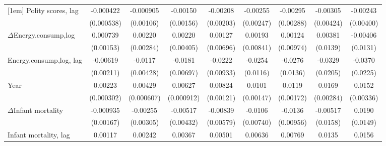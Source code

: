 \begin{table}[htbp]
\begin{tabular}{l*{8}{c}}
[1em]
Polity scores, lag           &   -0.000422         &   -0.000905         &    -0.00150         &    -0.00208         &    -0.00255         &    -0.00295         &    -0.00305         &    -0.00243         \\
                    &  (0.000538)         &   (0.00106)         &   (0.00156)         &   (0.00203)         &   (0.00247)         &   (0.00288)         &   (0.00424)         &   (0.00400)         \\
[1em]
$\Delta$Energy.consump,log             &    0.000739         &     0.00220         &     0.00220         &     0.00127         &     0.00193         &     0.00124         &     0.00381         &    -0.00406         \\
                    &   (0.00153)         &   (0.00284)         &   (0.00405)         &   (0.00696)         &   (0.00841)         &   (0.00974)         &    (0.0139)         &    (0.0131)         \\
[1em]
Energy.consump,log, lag            &    -0.00619\sym{***}&     -0.0117\sym{***}&     -0.0181\sym{**} &     -0.0222\sym{**} &     -0.0254\sym{**} &     -0.0276\sym{**} &     -0.0329         &     -0.0370         \\
                    &   (0.00211)         &   (0.00428)         &   (0.00697)         &   (0.00933)         &    (0.0116)         &    (0.0136)         &    (0.0205)         &    (0.0225)         \\
[1em]
Year                &     0.00223\sym{***}&     0.00429\sym{***}&     0.00627\sym{***}&     0.00824\sym{***}&      0.0101\sym{***}&      0.0119\sym{***}&      0.0169\sym{***}&      0.0152\sym{***}\\
                    &  (0.000302)         &  (0.000607)         &  (0.000912)         &   (0.00121)         &   (0.00147)         &   (0.00172)         &   (0.00284)         &   (0.00336)         \\
[1em]
$\Delta$Infant mortality&   -0.000935         &    -0.00255         &    -0.00517         &    -0.00839         &     -0.0106         &     -0.0136         &    -0.00517         &      0.0190         \\
                    &   (0.00167)         &   (0.00305)         &   (0.00432)         &   (0.00579)         &   (0.00740)         &   (0.00956)         &    (0.0158)         &    (0.0149)         \\
[1em]
Infant mortality, lag &     0.00117\sym{***}&     0.00242\sym{***}&     0.00367\sym{***}&     0.00501\sym{***}&     0.00636\sym{***}&     0.00769\sym{***}&      0.0135\sym{***}&      0.0156\sym{***}\\

\end{tabular}
\end{table}
